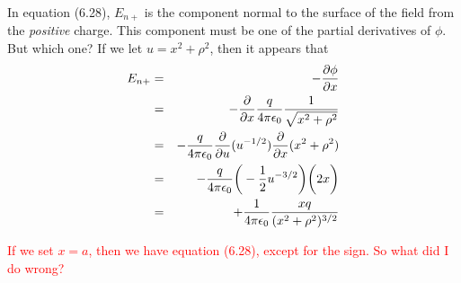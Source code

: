 In equation (6.28), $E_{n+}$ is the component normal to the surface of the field 
from the \emph{positive} charge.
This component must be one of the partial derivatives of $\phi$.  But which one?
If we let $u=x^2+\rho^2$, then it appears that
\begin{eqnarray}
  E_{n+} &=& -\frac{\partial \phi}{\partial x} \nonumber\\
  &=& -\frac{\partial }{\partial x} \frac{q}{4\pi\epsilon_0} \frac{1}{\sqrt{x^2+\rho^2}} \nonumber\\
  &=& -\frac{q}{4\pi\epsilon_0} \frac{\partial }{\partial u} (u^{-1/2}) \frac{\partial }{\partial x} (x^2+\rho^2) \nonumber\\
  &=& -\frac{q}{4\pi\epsilon_0} \bigg(-\frac{1}{2}u^{-3/2}\bigg)\bigg(2x\bigg) \nonumber\\
  &=& +\frac{1}{4\pi\epsilon_0} \frac{xq}{(x^2+\rho^2)^{3/2}} \nonumber
\end{eqnarray}

\textcolor{red}{
If we set $x=a$, then we have equation (6.28), except for the sign.
So what did I do wrong?
}

